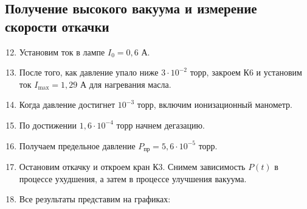 \documentclass[12pt]{article}
\begin{document}
    \subsection{Получение высокого вакуума и измерение скорости откачки}
    \begin{enumerate}
        \setcounter{enumi}{11}
        \item Установим ток в лампе $I_0 = 0{,}6$ А.
        \item После того, как давление упало ниже $3\cdot 10^{-2}$ торр, 
        закроем К6 и установим ток $I_{\text{max}} = 1{,}29$ А для нагревания
        масла. 
        \item Когда давление достигнет $10^{-3}$ торр, включим ионизационный
        манометр.
        \item По достижении $1{,}6\cdot 10^{-4}$ торр начнем дегазацию.
        \item Получаем предельное давление $P_{\text{пр}} = 5{,}6\cdot 10^{-5}$
        торр.
        \item Остановим откачку и откроем кран К3. Снимем зависимость $P(t)$
        в процессе ухудшения, а затем в процессе улучшения вакуума.
        \item Все результаты представим на графиках:
        \begin{figure}[H]
            \centering
            
            \caption{}
        \end{figure}
    \end{enumerate}
\end{document}
